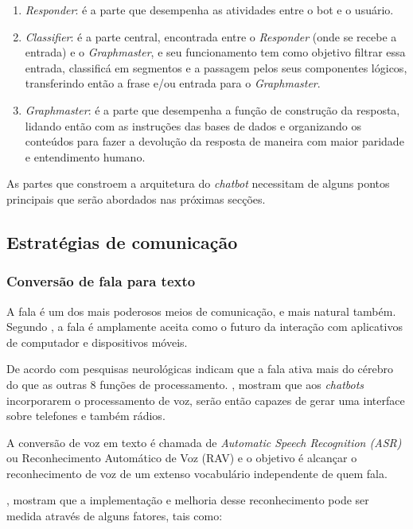 \documentclass[
	12pt,				%
	oneside,
	a4paper,			%
	english,			%
	french,				%
	spanish,			%
	brazil				%
	]{abntex2}
\begin{document}
\begin{enumerate}
	\item \emph{Responder}: é a parte que desempenha as atividades entre o bot e o usuário.
	\item \emph{Classifier}: é a parte central, encontrada entre o \emph{Responder} (onde se recebe a entrada) e o \emph{Graphmaster}, e seu funcionamento tem como objetivo filtrar essa entrada, classificá em segmentos e a passagem pelos seus componentes lógicos, transferindo então a frase e/ou entrada para o \emph{Graphmaster}.
	\item \emph{Graphmaster}: é a parte que desempenha a função de construção da resposta, lidando então com as instruções das bases de dados e organizando os conteúdos para fazer a devolução da resposta de maneira com maior paridade e entendimento humano.
\end{enumerate}

As partes que constroem a arquitetura do \emph{chatbot} necessitam de alguns pontos principais que serão abordados nas próximas secções.

\subsection{Estratégias de comunicação}
\subsubsection{Conversão de fala para texto}
A fala é um dos mais poderosos meios de comunicação, e mais natural também. Segundo \textcite{Abdul-Kader2015}, a fala é amplamente aceita como o futuro da interação com aplicativos de computador e dispositivos móveis.
 
De acordo com pesquisas neurológicas indicam que a fala ativa mais do cérebro do que as outras 8 funções de processamento. \textcite{wired-for-speech}, mostram que aos \emph{chatbots} incorporarem o processamento de voz, serão então capazes de gerar uma interface sobre telefones e também rádios.
 
A conversão de voz em texto é chamada de \emph{Automatic Speech Recognition (ASR)} ou Reconhecimento Automático de Voz (RAV) e o objetivo é alcançar o reconhecimento de voz de um extenso vocabulário independente de quem fala.

\textcite{wired-for-speech-2}, mostram que a implementação e melhoria desse reconhecimento pode ser medida através de alguns fatores, tais como:
\end{document}
